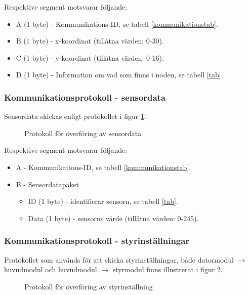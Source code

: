 \documentclass[11pt]{article}
\begin{document}
\begin{flushleft}
Respektive segment motsvarar följande: 
\begin{itemize}
	\item A (1 byte) - Kommunikations-ID, se tabell \ref{kommunikationstab}.
	\item B (1 byte) - x-koordinat (tillåtna värden: 0-30).
	\item C (1 byte) - y-koordinat (tillåtna värden: 0-16).
	\item D (1 byte) - Information om vad som finns i noden, se tabell \ref{tab}.
\end{itemize}

\subsubsection{Kommunikationsprotokoll - sensordata}
Sensordata skickas enligt protokollet i figur \ref{sensordata}.

 \begin{figure}[H]
\centering
\noindent\resizebox{.8\linewidth}{!}{
	}
	\caption{Protokoll för överföring av sensordata\label{sensordata}}	
\end{figure} 

Respektive segment motsvarar följande: 
\begin{itemize}
	\item A - Kommunikations-ID, se tabell \ref{kommunikationstab}.
	\item B - Sensordatapaket
	\begin{itemize}
	\item ID (1 byte) - identifierar sensorn, se tabell \ref{tab}.
	\item Data (1 byte) - sensorns värde (tillåtna värden: 0-245).
	\end{itemize}
\end{itemize}

\subsubsection{Kommunikationsprotokoll - styrinställningar}
Protokollet som används för att skicka styrinställningar, både datormodul $\rightarrow$ huvudmodul och huvudmodul $\rightarrow$ styrmodul finns illustrerat i figur \ref{styrkomm}.

\begin{figure}[htbp]
\centering
\noindent\resizebox{.8\linewidth}{!}{
	}
	\caption{Protokoll för överföring av styrinställning \label{styrkomm}}	
\end{figure}


\end{flushleft}
\end{document}
